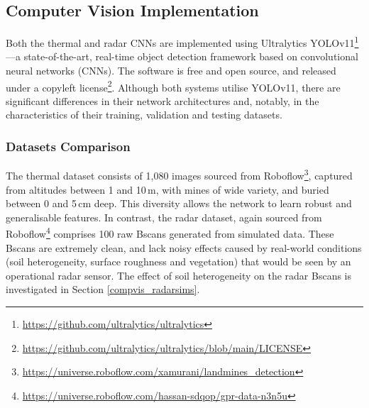 \subsection{Computer Vision Implementation} \label{compvis_implementation}

    Both the thermal and radar CNNs are implemented using Ultralytics YOLOv11\footnote{\url{https://github.com/ultralytics/ultralytics}}—a state-of-the-art, real-time object detection framework based on convolutional neural networks (CNNs). The software is free and open source, and released under a copyleft license\footnote{\url{https://github.com/ultralytics/ultralytics/blob/main/LICENSE}}. Although both systems utilise YOLOv11, there are significant differences in their network architectures and, notably, in the characteristics of their training, validation and testing datasets.


\subsubsection{Datasets Comparison}

The thermal dataset consists of 1,080 images sourced from Roboflow\footnote{\url{https://universe.roboflow.com/xamurani/landmines_detection}}, captured from altitudes between 1 and 10\,m, with mines of wide variety, and buried between 0 and 5\,cm deep. This diversity allows the network to learn robust and generalisable features. In contrast, the radar dataset, again sourced from Roboflow\footnote{\url{https://universe.roboflow.com/hassan-sdqop/gpr-data-n3n5u}} comprises 100 raw Bscans generated from simulated data. These Bscans are extremely clean, and lack noisy effects caused by real-world conditions (soil heterogeneity, surface roughness and vegetation) that would be seen by an operational radar sensor. The effect of soil heterogeneity on the radar Bscans is investigated in Section \ref{compvis_radarsims}. 

